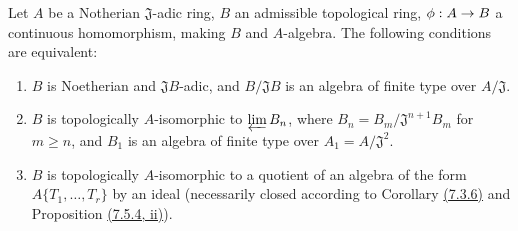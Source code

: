 \begin{prop}[7.5.5]
\label{0.7.5.5}
Let $A$ be a Notherian $\mathfrak{J}$-adic ring, $B$ an admissible topological ring,
$\phi:A\to B$ a continuous homomorphism, making $B$ and $A$-algebra. The following
conditions are equivalent:
\begin{enumerate}[label={\rm(\alph*)}]
  \item $B$ is Noetherian and $\mathfrak{J}B$-adic, and $B/\mathfrak{J}B$ is an
    algebra of finite type over $A/\mathfrak{J}$.
  \item $B$ is topologically $A$-isomorphic to $\varprojlim B_n$, where
    $B_n=B_m/\mathfrak{J}^{n+1}B_m$ for $m\geqslant n$, and $B_1$ is an algebra of finite
    type over $A_1=A/\mathfrak{J}^2$.
  \item $B$ is topologically $A$-isomorphic to a quotient of an algebra of the form
    $A\{T_1,\dots,T_r\}$ by an ideal (necessarily closed according to
    Corollary \hyperref[0.7.3.6]{(7.3.6)} and Proposition \hyperref[0.7.5.4]{(7.5.4, ii)}).
\end{enumerate}
\end{prop}

